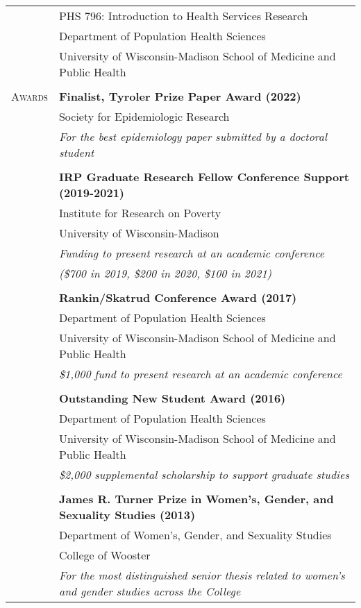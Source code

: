 \documentclass[letterpaper,10pt,oneside]{article}
\begin{document}
\begin{longtable}{@{} p{} p{}}
     & PHS 796: Introduction to Health Services Research \\
     & Department of Population Health Sciences \\
     & University of Wisconsin-Madison School of Medicine and Public Health \\
     & \\
\textsc{Awards} 
     &\textbf{Finalist, Tyroler Prize Paper Award (2022)} \\
     & Society for Epidemiologic Research \\
     & \textit{For the best epidemiology paper submitted by a doctoral student} \\
     & \\
     &\textbf{IRP Graduate Research Fellow Conference Support (2019-2021)} \\
     & Institute for Research on Poverty \\
     & University of Wisconsin-Madison \\
     & \textit{Funding to present research at an academic conference} \\
     & \textit{(\$700 in 2019, \$200 in 2020, \$100 in 2021)} \\
     & \\
     &\textbf{Rankin/Skatrud Conference Award (2017)} \\
     & Department of Population Health Sciences \\
     & University of Wisconsin-Madison School of Medicine and Public Health \\
     & \textit{\$1,000 fund to present research at an academic conference} \\
     & \\
     &\textbf{Outstanding New Student Award (2016)} \\
     & Department of Population Health Sciences \\
     & University of Wisconsin-Madison School of Medicine and Public Health \\
     & \textit{\$2,000 supplemental scholarship to support graduate studies} \\
     & \\
     &\textbf{James R. Turner Prize in Women's, Gender, and Sexuality Studies (2013)} \\
     & Department of Women's, Gender, and Sexuality Studies \\
     & College of Wooster \\
     & \textit{For the most distinguished senior thesis related to women's and gender studies across the College} \\

\end{longtable}
\end{document}
